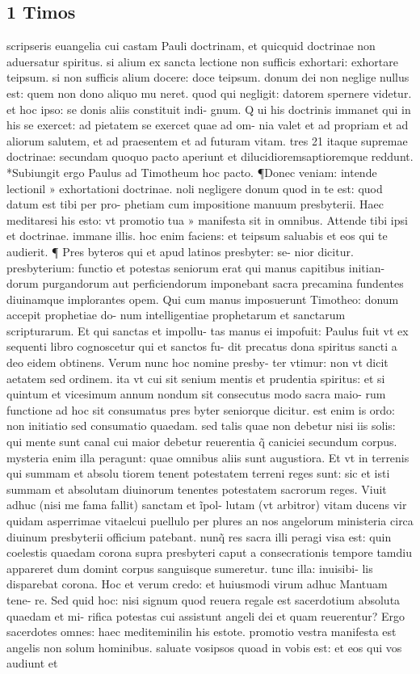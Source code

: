 \documentclass{article}
\begin{document}
\begin{pages}
\section*{1 Timos }
\marginpar{[ p.208 ]}\pstart scripseris euangelia cui castam Pauli doctrinam, et quicquid doctrinae non aduersatur spiritus. si alium ex sancta lectione non sufficis exhortari: exhortare teipsum. si non sufficis alium docere: doce teipsum. donum dei non neglige nullus est: quem non dono aliquo mu neret. quod qui negligit: datorem spernere videtur. et hoc ipso: se donis aliis constituit indi- gnum. Q ui his doctrinis immanet qui in his se exercet: ad pietatem se exercet quae ad om- nia valet et ad propriam et ad aliorum salutem, et ad praesentem et ad futuram vitam. tres 21 itaque supremae doctrinae: secundam quoquo pacto aperiunt et dilucidioremsaptioremque reddunt. *Subiungit ergo Paulus ad Timotheum hoc pacto. ¶Donec veniam: intende lectionil » exhortationi doctrinae. noli negligere donum quod in te est: quod datum est tibi per pro-  phetiam cum impositione manuum presbyterii. Haec meditaresi his esto: vt promotio tua » manifesta sit in omnibus. Attende tibi ipsi et doctrinae. immane illis. hoc enim faciens: et  teipsum saluabis et eos qui te audierit. ¶ Pres byteros qui et apud latinos presbyter: se- nior dicitur. presbyterium: functio et potestas seniorum erat qui manus capitibus initian- dorum purgandorum aut perficiendorum imponebant sacra precamina fundentes diuinamque  implorantes opem. Qui cum manus imposuerunt Timotheo: donum accepit prophetiae do- num intelligentiae prophetarum et sanctarum scripturarum. Et qui sanctas et impollu- tas manus ei impofuit: Paulus fuit vt ex sequenti libro cognoscetur qui et sanctos fu- dit precatus dona spiritus sancti a deo eidem obtinens. Verum nunc hoc nomine presby- ter vtimur: non vt dicit aetatem sed ordinem. ita vt cui sit senium mentis et prudentia spiritus: et si quintum et vicesimum annum nondum sit consecutus modo sacra maio- rum functione ad hoc sit consumatus pres byter seniorque dicitur. est enim is ordo: non initiatio sed consumatio quaedam. sed talis quae non debetur nisi iis solis: qui mente sunt canal cui maior debetur reuerentia q̃ caniciei secundum corpus. mysteria enim illa peragunt: quae omnibus aliis sunt augustiora. Et vt in terrenis qui summam et absolu tiorem tenent potestatem terreni reges sunt: sic et isti summam et absolutam diuinorum tenentes potestatem sacrorum reges. Viuit adhuc (nisi me fama fallit) sanctam et ĩpol- lutam (vt arbitror) vitam ducens vir quidam asperrimae vitaelcui puellulo per plures an nos angelorum ministeria circa diuinum presbyterii officium patebant. nunq̃ res sacra illi peragi visa est: quin coelestis quaedam corona supra presbyteri caput a consecrationis tempore tamdiu appareret dum domint corpus sanguisque sumeretur. tunc illa: inuisibi- lis disparebat corona. Hoc et verum credo: et huiusmodi virum adhuc Mantuam tene- re. Sed quid hoc: nisi signum quod reuera regale est sacerdotium absoluta quaedam et mi- rifica potestas cui assistunt angeli dei et quam reuerentur? Ergo sacerdotes omnes: haec mediteminilin his estote. promotio vestra manifesta est angelis non solum hominibus. saluate vosipsos quoad in vobis est: et eos qui vos audiunt et 
\end{pages}
\end{document}
